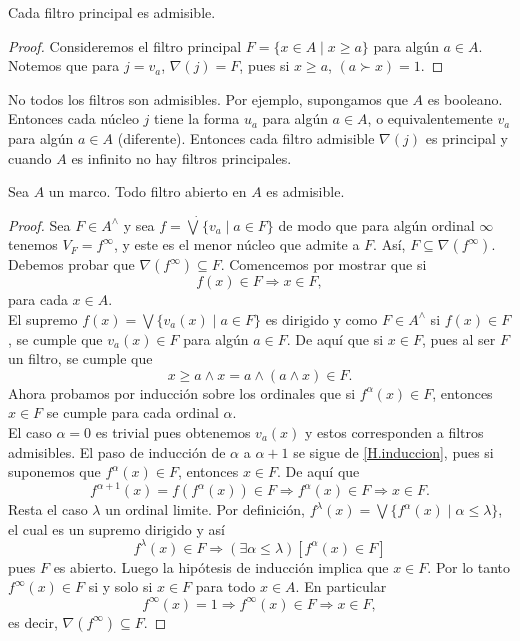 \begin{lem}
    Cada filtro principal es admisible.
\end{lem}

\begin{proof}
    Consideremos el filtro principal $F=\{x\in A\mid x\geq a\}$ para algún $a\in A$. Notemos que para $j=v_a$, $\nabla(j)=F$, pues si $x\geq a$, $(a\succ x)=1$. 
\end{proof}

No todos los filtros son admisibles. Por ejemplo, supongamos que $A$ es booleano. Entonces cada núcleo $j$ tiene la forma $u_a$ para algún $a\in A$, o equivalentemente $v_a$ para algún $a\in A$ (diferente). Entonces cada filtro admisible $\nabla(j)$ es principal y cuando $A$ es infinito no hay filtros principales.

\begin{lem}\label{Lema5.5.4}
    Sea $A$ un marco. Todo filtro abierto en $A$ es admisible.
\end{lem}

\begin{proof}
    Sea $F\in A^{\wedge}$ y sea $f=\dot{\bigvee}\{v_a\mid a\in F\}$ de modo que para algún ordinal $\infty$ tenemos $V_F=f^\infty$, y este es el menor núcleo que admite a $F$. Así, $F\subseteq \nabla(f^\infty)$. Debemos probar que $\nabla(f^\infty)\subseteq F$. Comencemos por mostrar que si 
    \begin{equation}\label{H.induccion}
        f(x)\in F \Rightarrow x\in F,
    \end{equation}
    para cada $x\in A$.\\

    El supremo $f(x)=\bigvee\{v_a(x)\mid a\in F\}$ es dirigido y como $F\in A^\wedge$ si $f(x)\in F$, se cumple que $v_a(x)\in F$ para algún $a\in F$. De aquí que si $x\in F$, pues al ser $F$ un filtro, se cumple que 
    \[
    x\geq a\wedge x=a\wedge (a\wedge x)\in F.
    \]
    Ahora probamos por inducción sobre los ordinales que si $f^\alpha(x)\in F$, entonces $x\in F$ se cumple para cada ordinal $\alpha$.\\

    El caso $\alpha =0$ es trivial pues obtenemos $v_a(x)$ y estos corresponden a filtros admisibles. El paso de inducción de $\alpha$ a $\alpha +1$ se sigue de \ref{H.induccion}, pues si suponemos que $f^\alpha (x)\in F$, entonces $x\in F$. De aquí que 
    \[
    f^{\alpha +1}(x)=f(f^\alpha(x))\in F\Rightarrow f^\alpha(x)\in F\Rightarrow x\in F.
    \]
    Resta el caso $\lambda$ un ordinal limite. Por definición, $f^\lambda (x)=\bigvee\{f^\alpha(x)\mid \alpha\leq \lambda\}$, el cual es un supremo dirigido y así
    \[
    f^\lambda(x)\in F\Rightarrow (\exists \alpha \leq \lambda )[f^\alpha (x)\in F]
    \]
    pues $F$ es abierto. Luego la hipótesis de inducción implica que $x\in F$. Por lo tanto $f^\infty (x)\in F$ si y solo si $x\in F$ para todo $x\in A$. En particular 
    \[
    f^\infty (x)=1\Rightarrow f^\infty (x)\in F\Rightarrow x\in F,
    \]
    es decir, $\nabla(f^\infty )\subseteq F$. 
\end{proof}

